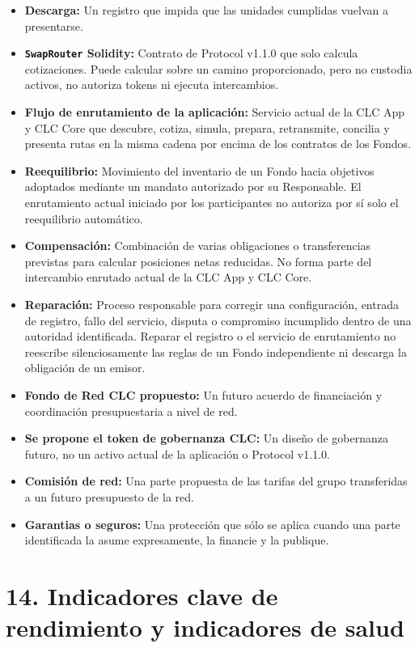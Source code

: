 \documentclass[11pt]{article}
\begin{document}
\begin{itemize}[leftmargin=*]
\item \textbf{Descarga:} Un registro que impida que las unidades cumplidas vuelvan a presentarse.
\item \textbf{\texttt{SwapRouter} Solidity:} Contrato de Protocol v1.1.0 que solo calcula cotizaciones. Puede calcular sobre un camino proporcionado, pero no custodia activos, no autoriza tokens ni ejecuta intercambios.
\item \textbf{Flujo de enrutamiento de la aplicación:} Servicio actual de la CLC App y CLC Core que descubre, cotiza, simula, prepara, retransmite, concilia y presenta rutas en la misma cadena por encima de los contratos de los Fondos.
\item \textbf{Reequilibrio:} Movimiento del inventario de un Fondo hacia objetivos adoptados mediante un mandato autorizado por su Responsable. El enrutamiento actual iniciado por los participantes no autoriza por sí solo el reequilibrio automático.
\item \textbf{Compensación:} Combinación de varias obligaciones o transferencias previstas para calcular posiciones netas reducidas. No forma parte del intercambio enrutado actual de la CLC App y CLC Core.
\item \textbf{Reparación:} Proceso responsable para corregir una configuración, entrada de registro, fallo del servicio, disputa o compromiso incumplido dentro de una autoridad identificada. Reparar el registro o el servicio de enrutamiento no reescribe silenciosamente las reglas de un Fondo independiente ni descarga la obligación de un emisor.
\item \textbf{Fondo de Red CLC propuesto:} Un futuro acuerdo de financiación y coordinación presupuestaria a nivel de red.
\item \textbf{Se propone el token de gobernanza CLC:} Un diseño de gobernanza futuro, no un activo actual de la aplicación o Protocol v1.1.0.
\item \textbf{Comisión de red:} Una parte propuesta de las tarifas del grupo transferidas a un futuro presupuesto de la red.
\item \textbf{Garantias o seguros:} Una protección que sólo se aplica cuando una parte identificada la asume expresamente, la financie y la publique.
\end{itemize}

\section*{14. Indicadores clave de rendimiento y indicadores de salud}
\end{document}
